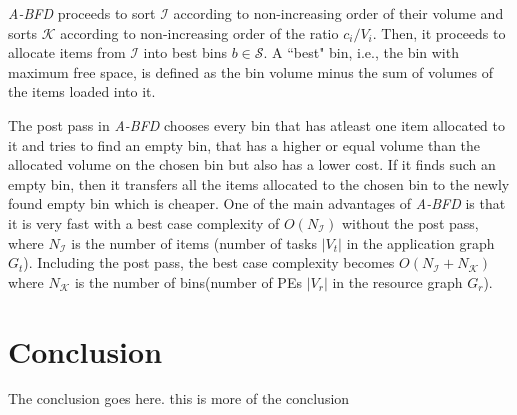 \documentclass[10pt, conference, compsocconf]{IEEEtran}
\begin{document}
\textit{A-BFD} proceeds to sort $\mathcal{I}$ according to
non-increasing order of their volume and sorts $\mathcal{K}$ according
to non-increasing order of the ratio $c_i/V_i$. Then, it proceeds to
allocate items from $\mathcal{I}$ into best bins $b \in \mathcal{S}$. A
``best" bin, i.e., the bin with maximum free space, is defined as the
bin volume minus the sum of volumes of the items loaded into it. %

The post pass in \textit{A-BFD} chooses every bin that has atleast one
item allocated to it and tries to find an empty bin, that has a higher
or equal volume than the allocated volume on the chosen bin but also has
a lower cost. If it finds such an empty bin, then it transfers all the
items allocated to the chosen bin to the newly found empty bin which is
cheaper. One of the main advantages of \textit{A-BFD} is that it is very
fast with a best case complexity of $O(N_\mathcal{I})$ without the post
pass, where $N_\mathcal{I}$ is the number of items (number of tasks
$|V_t|$ in the application graph $G_t$). Including the post pass, the
best case complexity becomes $O(N_\mathcal{I} + N_\mathcal{K})$ where
$N_\mathcal{K}$ is the number of bins(number of PEs $|V_r|$ in the
resource graph $G_r$).

\section{Conclusion}
\label{sec:conclusion}

The conclusion goes here. this is more of the conclusion





\end{document}
